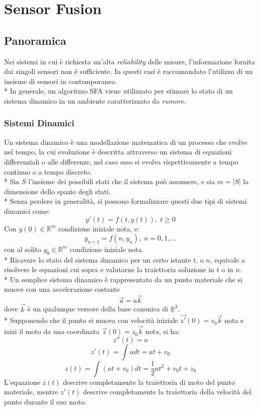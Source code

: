 \chapter{Sensor Fusion}
\section{Panoramica}
Nei sistemi in cui \`e richiesta un'alta \emph{reliability} delle misure, l'informazione fornita dai singoli sensori non \`e sufficiente. In questi casi \`e raccomandato l'utilizzo di un insieme di sensori in contemporanea.\\*
In generale, un algoritmo SFA viene utilizzato per stimare lo stato di un sistema dinamico in un ambiente caratterizzato da \emph{rumore}.
\subsection{Sistemi Dinamici}
Un sistema dinamico \`e una modellazione matematica di un processo che evolve nel tempo, la cui evoluzione \`e descritta attraverso un sistema di equazioni differenziali o alle differenze, nel caso esso si evolva rispettivamente a tempo continuo o a tempo discreto.\\*
Sia $S$ l'insieme dei possibili stati che il sistema pu\`o assumere, e sia $m = |S|$ la dimensione dello spazio degli stati.\\*
Senza perdere in generalit\`a, si possono formalizzare questi due tipi di sistemi dinamici come:
$$
y'(t) = f(t,y(t)),\;t\ge 0
$$
Con $y(0) \in \mathbb{R}^m$ condizione iniziale nota, e:
$$
y_{n+1} = f(n,y_n),\;n = 0,1,\dots
$$
con al solito $y_0 \in \mathbb{R}^m$ condizione iniziale nota.\\*
Ricavare lo stato del sistema dinamico per un certo istante $t$, o $n$, equivale a risolvere le equazioni cui sopra e valutarne la traiettoria soluzione in $t$ o in $n$.\\*
Un semplice sistema dinamico \`e rappresentato da un punto materiale che si muove con una accelerazione costante $$\vec{a} = a\vec{k}$$ dove $\vec{k}$ \`e un qualunque versore della base canonica di $\mathbb{R}^3$.\\*
Supponendo che il punto si muova con velocit\`a iniziale $\vec{z'}(0) = v_0\vec{k}$ nota e inizi il moto da una coordinata $\vec z(0) = z_0\vec{k}$ nota, si ha:
$$
z''(t) = a
$$
$$
z'(t) = \int{a dt} = a t + v_0
$$
$$
z(t) = \int(a t + v_0)dt = \frac{1}{2} at^2 +  v_0 t + z_0
$$
L'equazione $z(t)$ descrive completamente la traiettoria di moto del punto materiale, mentre $z'(t)$ descrive completamente la traiettoria della velocit\`a del punto durante il suo moto.

